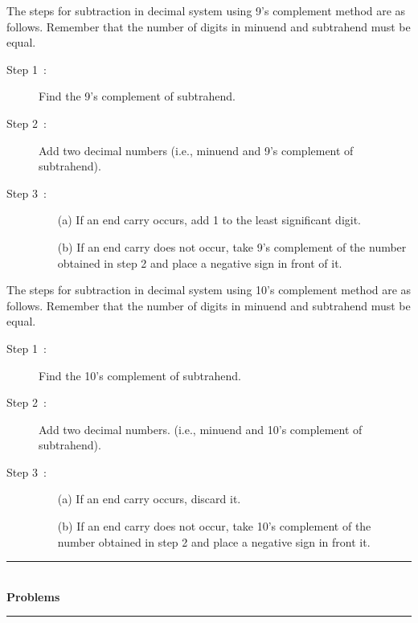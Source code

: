 \smallskip
{} The steps for subtraction in decimal system using 9's complement method are as follows. Remember that the number of digits in minuend and subtrahend must be equal.
\begin{description}
\item[Step 1~:] Find the 9's complement of subtrahend.

\item[Step 2~:] Add two decimal numbers (i.e., minuend and 9's complement of subtrahend).

\item[Step 3~:] 
\begin{itemize}
\item[(a)] If an end carry occurs, add 1 to the least significant digit.

\item[(b)] If an end carry does not occur, take 9's complement of the number obtained in step 2 and place a negative sign in front of it.
\end{itemize}
\end{description}

 The steps for subtraction in decimal system using 10's complement method are as follows. Remember that the number of digits in minuend and subtrahend must be equal.
\begin{description}
\item[Step 1~:] Find the 10's complement of subtrahend.

\item[Step 2~:] Add two decimal numbers. (i.e., minuend and 10's complement of subtrahend).

\item[Step 3~:]
\begin{itemize}
\item[(a)] If an end carry occurs, discard it.

\item[(b)] If an end carry does not occur, take 10's complement of the number obtained in step 2 and place a negative sign in front it.
\end{itemize}
\end{description}

\eject

\begin{center}
\rule{4cm}{1pt}\\
{\bf\Large Problems}\\[-3pt]
\rule{4cm}{1pt}
\end{center}

